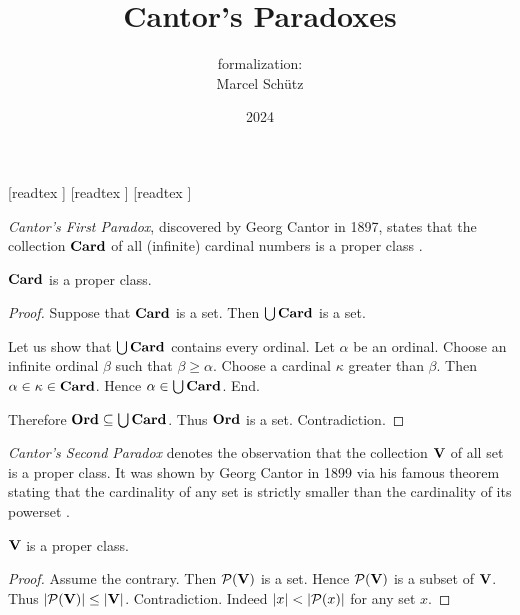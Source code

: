 \documentclass{article}
\title{Cantor's Paradoxes}
\author{\Naproche formalization: \vspace{0.5em} \\
Marcel Schütz}
\date{2024}
\begin{document}
  \maketitle

  \begin{imports}
    \begin{forthel}
      [readtex ]
      [readtex ]
      [readtex ]
    \end{forthel}
  \end{imports}

  \noindent \emph{Cantor's First Paradox}, discovered by Georg Cantor in 1897,
  states that the collection $\textbf{Card}$ of all (infinite) cardinal numbers is a
  proper class \cite[chapter 156]{Cantor1991}.

  \begin{forthel}
    \begin{theorem*}\label{cantor_paradox_1}
      $\textbf{Card}$ is a proper class.
    \end{theorem*}
    \begin{proof}
      Suppose that $\textbf{Card}$ is a set.
      Then $\bigcup \textbf{Card}$ is a set.

      Let us show that $\bigcup \textbf{Card}$ contains every ordinal.
        Let $\alpha$ be an ordinal.
        Choose an infinite ordinal $\beta$ such that $\beta \geq \alpha$.
        Choose a cardinal $\kappa$ greater than $\beta$.
        Then $\alpha \in \kappa \in \textbf{Card}$.
        Hence $\alpha \in \bigcup \textbf{Card}$.
      End.

      Therefore $\textbf{Ord} \subseteq \bigcup \textbf{Card}$.
      Thus $\textbf{Ord}$ is a set.
      Contradiction.
    \end{proof}
  \end{forthel}

  \emph{Cantor's Second Paradox} denotes the observation that the collection
  $\textbf{V}$ of all set is a proper class.
  It was shown by Georg Cantor in 1899 via his famous theorem stating that the
  cardinality of any set is strictly smaller than the cardinality of its 
  powerset \cite[chapter 163]{Cantor1991}.

  \begin{forthel}
    \begin{theorem*}\label{cantor_paradox_2}
      $\textbf{V}$ is a proper class.
    \end{theorem*}
    \begin{proof}
      Assume the contrary.
      Then $\mathcal{P}(\textbf{V})$ is a set.
      Hence $\mathcal{P}(\textbf{V})$ is a subset of $\textbf{V}$.
      Thus $|\mathcal{P}(\textbf{V})| \leq |\textbf{V}|$.
      Contradiction.
      Indeed $|x| < |\mathcal{P}(x)|$ for any set $x$.
    \end{proof}
  \end{forthel}

  \printbibliography
\end{document}
